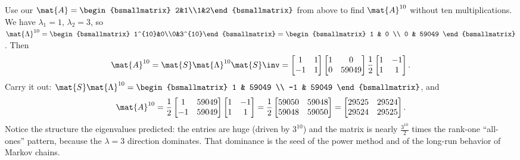 \begin{example}
\label{ch24:power-example}
Use our $\mat{A} = \begin{bsmallmatrix} 2&1\\1&2\end{bsmallmatrix}$ from above to
find $\mat{A}^{10}$ without ten multiplications. We have $\lambda_1=1$,
$\lambda_2=3$, so $\mat{\Lambda}^{10} = \begin{bsmallmatrix} 1^{10}&0\\0&3^{10}\end{bsmallmatrix}
= \begin{bsmallmatrix} 1 & 0 \\ 0 & 59049 \end{bsmallmatrix}$. Then
\[
  \mat{A}^{10}
  = \mat{S}\mat{\Lambda}^{10}\mat{S}\inv
  = \begin{bmatrix} 1 & 1 \\ -1 & 1 \end{bmatrix}
    \begin{bmatrix} 1 & 0 \\ 0 & 59049 \end{bmatrix}
    \frac{1}{2}\begin{bmatrix} 1 & -1 \\ 1 & 1 \end{bmatrix}.
\]
Carry it out: $\mat{S}\mat{\Lambda}^{10} = \begin{bsmallmatrix} 1 & 59049 \\ -1 & 59049 \end{bsmallmatrix}$, and
\[
  \mat{A}^{10}
  = \frac{1}{2}\begin{bmatrix} 1 & 59049 \\ -1 & 59049 \end{bmatrix}\begin{bmatrix} 1 & -1 \\ 1 & 1 \end{bmatrix}
  = \frac{1}{2}\begin{bmatrix} 59050 & 59048 \\ 59048 & 59050 \end{bmatrix}
  = \begin{bmatrix} 29525 & 29524 \\ 29524 & 29525 \end{bmatrix}.
\]
Notice the structure the eigenvalues predicted: the entries are huge (driven by
$3^{10}$) and the matrix is nearly $\tfrac{3^{10}}{2}$ times the rank-one
``all-ones'' pattern, because the $\lambda=3$ direction dominates. That dominance
is the seed of the power method and of the long-run behavior of Markov chains.
\end{example}

